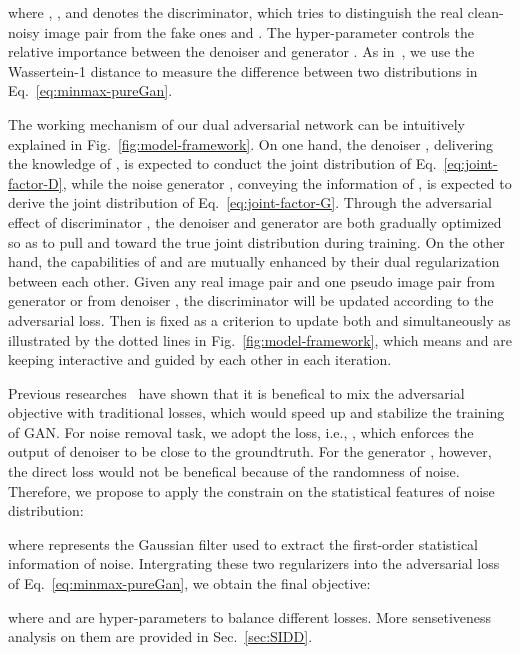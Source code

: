 \documentclass[runningheads]{llncs}
\begin{document}
where , , and  denotes the discriminator,
which tries to distinguish the real clean-noisy image pair  from the fake ones
 and .
The hyper-parameter  controls the relative importance between the denoiser
 and generator . As in~\cite{arjovsky2017wasserstein}, we use the Wassertein-1 distance to measure
the difference between two distributions in Eq.~\eqref{eq:minmax-pureGan}.

The working mechanism of our dual adversarial network can be intuitively explained in
Fig.~\ref{fig:model-framework}. On one hand, the denoiser , delivering the knowledge of ,
is expected to conduct the joint distribution  of Eq.~\eqref{eq:joint-factor-D},
while the noise generator , conveying the information
of , is expected to derive the joint distribution  of
Eq.~\eqref{eq:joint-factor-G}.
Through the adversarial effect of discriminator ,
the denoiser  and generator  are both gradually optimized so as to pull  and  toward
the true joint distribution  during training. On the other hand, the capabilities of  and 
are mutually enhanced by their dual regularization between each other. Given any real image pair 
and one pseudo image pair  from generator  or  from denoiser ,
the discriminator  will be updated according to the adversarial loss. Then  is fixed as a criterion to update
both  and  simultaneously as illustrated by the dotted lines in Fig.~\ref{fig:model-framework}, which means
 and  are keeping interactive and guided by each other in each iteration.

Previous researches~\cite{isola2017image,zhu2017unpaired} have shown that it is benefical to mix the adversarial
objective with traditional losses, which would speed up and stabilize the training of GAN.
For noise removal task, we adopt the  loss, i.e., , which enforces
the output of denoiser  to be close to the groundtruth. For the generator , however, the direct  loss
would not be benefical because of the randomness of noise.
Therefore, we propose to apply the  constrain on the statistical features of noise distribution:

where  represents the Gaussian filter used to extract the first-order statistical
information of noise. Intergrating these two regularizers into the adversarial loss of
Eq.~\eqref{eq:minmax-pureGan}, we obtain the final objective:

where  and  are hyper-parameters to balance different losses.
More sensetiveness analysis on them are provided in Sec.~\ref{sec:SIDD}.
\end{document}
